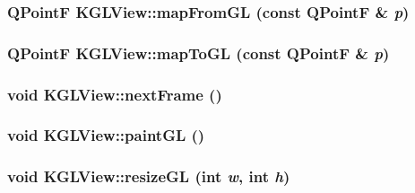 \hypertarget{class_k_g_l_view_7afa395fcb499b10cd3303e9dede9cef}{
\subsubsection[{mapFromGL}]{\setlength{\rightskip}{0pt plus 5cm}QPointF KGLView::mapFromGL (const QPointF \& {\em p})}}
\label{class_k_g_l_view_7afa395fcb499b10cd3303e9dede9cef}


\hypertarget{class_k_g_l_view_b5d64f06b3602a0ca6ff41d71fc65aa3}{
\subsubsection[{mapToGL}]{\setlength{\rightskip}{0pt plus 5cm}QPointF KGLView::mapToGL (const QPointF \& {\em p})}}
\label{class_k_g_l_view_b5d64f06b3602a0ca6ff41d71fc65aa3}


\hypertarget{class_k_g_l_view_793fefddaec50bf299834893ea4a1f91}{
\subsubsection[{nextFrame}]{\setlength{\rightskip}{0pt plus 5cm}void KGLView::nextFrame ()}}
\label{class_k_g_l_view_793fefddaec50bf299834893ea4a1f91}


\hypertarget{class_k_g_l_view_46018bb23711a3ae7ce5dc37b46302bb}{
\subsubsection[{paintGL}]{\setlength{\rightskip}{0pt plus 5cm}void KGLView::paintGL ()}}
\label{class_k_g_l_view_46018bb23711a3ae7ce5dc37b46302bb}


\hypertarget{class_k_g_l_view_1599a4d77e626cc204f565031ae5bf81}{
\subsubsection[{resizeGL}]{\setlength{\rightskip}{0pt plus 5cm}void KGLView::resizeGL (int {\em w}, \/  int {\em h})}}
\label{class_k_g_l_view_1599a4d77e626cc204f565031ae5bf81}



